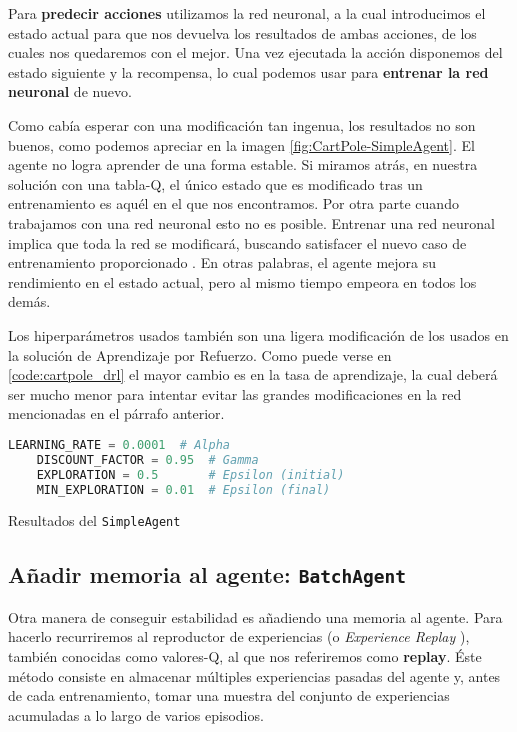 Para \textbf{predecir acciones} utilizamos la red neuronal, a la cual introducimos el estado actual para que nos devuelva los resultados de ambas acciones, de los cuales nos quedaremos con el mejor. Una vez ejecutada la acción disponemos del estado siguiente y la recompensa, lo cual podemos usar para \textbf{entrenar la red neuronal} de nuevo.

Como cabía esperar con una modificación tan ingenua, los resultados no son buenos, como podemos apreciar en la imagen \ref{fig:CartPole-SimpleAgent}. El agente no logra aprender de una forma estable. Si miramos atrás, en nuestra solución con una tabla-Q, el único estado que es modificado tras un entrenamiento es aquél en el que nos encontramos. Por otra parte cuando trabajamos con una red neuronal esto no es posible. Entrenar una red neuronal implica que toda la red se modificará, buscando satisfacer el nuevo caso de entrenamiento proporcionado \citep{Buduma:backprop}. En otras palabras, el agente mejora su rendimiento en el estado actual, pero al mismo tiempo empeora en todos los demás.

Los hiperparámetros usados también son una ligera modificación de los usados en la solución de Aprendizaje por Refuerzo. Como puede verse en \ref{code:cartpole_drl} el mayor cambio es en la tasa de aprendizaje, la cual deberá ser mucho menor para intentar evitar las grandes modificaciones en la red mencionadas en el párrafo anterior.

\begin{minipage}{0.9\linewidth}%
    \begin{lstlisting}[frame=tb, language=Python, caption=Hiperparámetros, label=code:cartpole_drl]
    LEARNING_RATE = 0.0001  # Alpha
    DISCOUNT_FACTOR = 0.95  # Gamma
    EXPLORATION = 0.5       # Epsilon (initial)
    MIN_EXPLORATION = 0.01  # Epsilon (final)
    \end{lstlisting}%
\end{minipage}

%
       {Resultados del \texttt{SimpleAgent}}

\subsection{Añadir memoria al agente: \texttt{BatchAgent}}

Otra manera de conseguir estabilidad es añadiendo una memoria al agente. Para hacerlo recurriremos al reproductor de experiencias (o \textit{Experience Replay} \citep{Lin1992}), también conocidas como valores-Q, al que nos referiremos como \textbf{replay}. Éste método consiste en almacenar múltiples experiencias pasadas del agente y, antes de cada entrenamiento, tomar una muestra del conjunto de experiencias acumuladas a lo largo de varios episodios.

